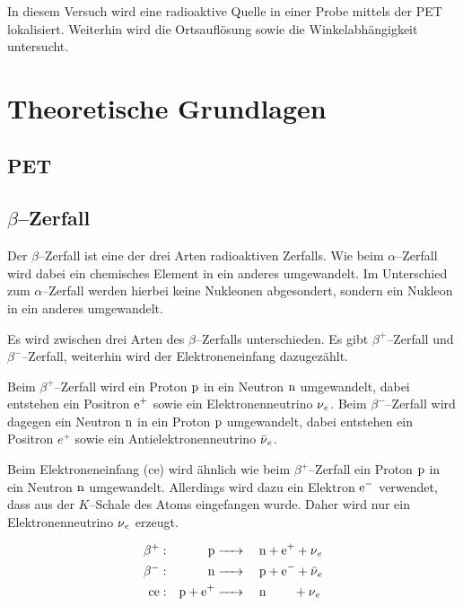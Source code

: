 \documentclass[12pt,a4paper]{scrartcl}
\numberwithin{equation}{section} %
\begin{document}
In diesem Versuch wird eine radioaktive Quelle in einer Probe mittels
der PET lokalisiert. Weiterhin wird die Ortsauflösung sowie die
Winkelabhängigkeit untersucht.

\clearpage
\hypertarget{theoretische-grundlagen}{%
\section{Theoretische Grundlagen}\label{theoretische-grundlagen}}

\hypertarget{pet}{%
\subsection{PET}\label{pet}}

\hypertarget{betazerfall}{%
\subsection{\texorpdfstring{\(\beta\)--Zerfall}{\textbackslash beta--Zerfall}}\label{betazerfall}}

Der \(\beta\)--Zerfall ist eine der drei Arten radioaktiven Zerfalls.
Wie beim \(\alpha\)--Zerfall wird dabei ein chemisches Element in ein
anderes umgewandelt. Im Unterschied zum \(\alpha\)--Zerfall werden
hierbei keine Nukleonen abgesondert, sondern ein Nukleon in ein anderes
umgewandelt.

Es wird zwischen drei Arten des \(\beta\)--Zerfalls unterschieden. Es
gibt \(\beta^+\)--Zerfall und \(\beta^-\)--Zerfall, weiterhin wird der
Elektroneneinfang dazugezählt.

Beim \(\beta^+\)--Zerfall wird ein Proton \(\ce p\) in ein Neutron
\(\ce n\) umgewandelt, dabei entstehen ein Positron \(\ce{e^+}\) sowie
ein Elektronenneutrino \(\ce{\nu_e}\). Beim \(\beta^-\)--Zerfall wird
dagegen ein Neutron \(\ce n\) in ein Proton \(\ce p\) umgewandelt, dabei
entstehen ein Positron \(e^+\) sowie ein Antielektronenneutrino
\(\ce{\bar{\nu}_e}\).

Beim Elektroneneinfang (ce) wird ähnlich wie beim \(\beta^+\)--Zerfall
ein Proton \(\ce p\) in ein Neutron \(\ce n\) umgewandelt. Allerdings
wird dazu ein Elektron \(\ce{e^-}\) verwendet, dass aus der
\(K\)--Schale des Atoms eingefangen wurde. Daher wird nur ein
Elektronenneutrino \(\ce{\nu_e}\) erzeugt.

\[
\begin{aligned}
    \beta^+: &&\ce{p} &\ce{->}&& \ce{n} + \ce{e^+} + \ce{\nu_e} \\
    \beta^-: &&\ce{n} &\ce{->}&& \ce{p} + \ce{e^-} + \ce{\bar{\nu}_e} \\
    \mathrm{ce}: &&\ce{p + e^+} &\ce{->}&& \ce{n} \qquad\,+ \ce{\nu_e}
\end{aligned}
\]
\end{document}
